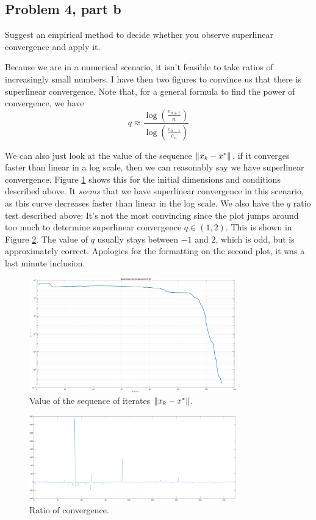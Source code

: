 \newpage
\subsection{Problem 4, part b}
Suggest an empirical method to decide whether you observe superlinear convergence and apply it. 
\partbreak
\begin{solution}

    Because we are in a numerical scenario, it isn't feasible to take ratios of increasingly small numbers. I have then two figures to convince us that there is superlinear convergence. Note that, for a general formula to find the power of convergence, we have
    \[q \approx \frac{\log \left( \frac{e_{n+1}}{n}\right)}{\log \left( \frac{e_{n-1}}{e_n}\right)}\]

    We can also just look at the value of the sequence $\norm{x_k - x^*}$, if it converges faster than linear in a log scale, then we can reasonably say we have superlinear convergence. Figure \ref{fig:sup-conv} shows this for the initial dimensions and conditions described above. It \textit{seems} that we have superlinear convergence in this scenario, as this curve decreases faster than linear in the log scale. We also have the $q$ ratio test described above: It's not the most convincing since the plot jumps around too much to determine superlinear convergence $q \in (1, 2)$. This is shown in Figure \ref{fig:sup-conv2}. The value of $q$ usually stays between $-1$ and $2$, which is odd, but is approximately correct. Apologies for the formatting on the second plot, it was a last minute inclusion. 
\end{solution}

\vspace{15mm}
\begin{figure}[!ht]
    \centering
    \includegraphics[width=0.8\textwidth]{Plots/sup_conv.png}
    \caption{Value of the sequence of iterates $\norm{x_k - x^*}$.}
    \label{fig:sup-conv}
\end{figure}

\clearpage
\begin{figure}[!h]
    \centering
    \includegraphics[width = 0.8\textwidth]{Plots/sup_conv2.png}
    \caption{Ratio of convergence.}
    \label{fig:sup-conv2}
\end{figure}
